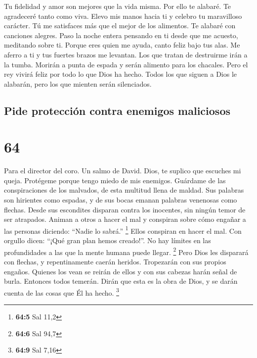  Tu fidelidad y amor son mejores que la vida misma. Por ello
te alabaré.  Te agradeceré tanto como viva. Elevo mis manos
hacia ti y celebro tu maravilloso carácter.  Tú me
satisfaces más que el mejor de los alimentos. Te alabaré con canciones
alegres.  Paso la noche entera pensando en ti desde que me
acuesto, meditando sobre ti.  Porque eres quien me ayuda,
canto feliz bajo tus alas.  Me aferro a ti y tus fuertes
brazos me levantan.  Los que tratan de destruirme irán a la
tumba.  Morirán a punta de espada y serán alimento para los
chacales.  Pero el rey vivirá feliz por todo lo que Dios ha
hecho. Todos los que siguen a Dios le alabarán, pero los que mienten
serán silenciados.

\hypertarget{pide-protecciuxf3n-contra-enemigos-maliciosos}{%
\subsection{Pide protección contra enemigos
maliciosos}\label{pide-protecciuxf3n-contra-enemigos-maliciosos}}

\hypertarget{section-63}{%
\section{64}\label{section-63}}

Para el director del coro. Un salmo de David.  Dios, te
suplico que escuches mi queja. Protégeme porque tengo miedo de mis
enemigos.  Guárdame de las conspiraciones de los malvados,
de esta multitud llena de maldad.  Sus palabras son
hirientes como espadas, y de sus bocas emanan palabras venenosas como
flechas.  Desde sus escondites disparan contra los
inocentes, sin ningún temor de ser atrapados.  Animan a
otros a hacer el mal y conspiran sobre cómo engañar a las personas
diciendo: ``Nadie lo sabrá.'' \footnote{\textbf{64:5} Sal 11,2}
 Ellos conspiran en hacer el mal. Con orgullo dicen: ``¡Qué
gran plan hemos creado!''. No hay límites en las profundidades a las que
la mente humana puede llegar. \footnote{\textbf{64:6} Sal 94,7}
 Pero Dios les disparará con flechas, y repentinamente
caerán heridos.  Tropezarán con sus propios engaños. Quienes
los vean se reirán de ellos y con sus cabezas harán señal de burla.
 Entonces todos temerán. Dirán que esta es la obra de Dios,
y se darán cuenta de las cosas que Él ha hecho. \footnote{\textbf{64:9}
  Sal 7,16}

